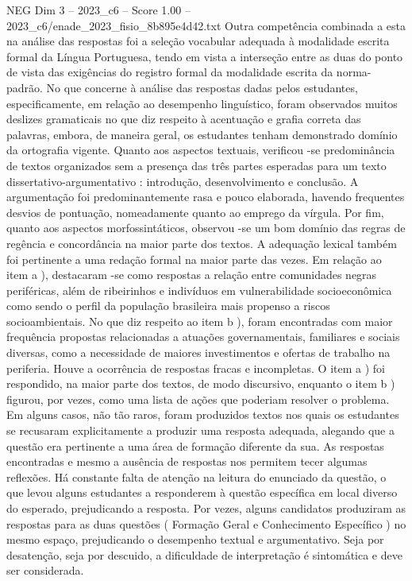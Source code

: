 \begin{textsample}{NEG Dim 3 – 2023\_c6 – Score 1.00 – 2023\_c6/enade\_2023\_fisio\_8b895e4d42.txt}
Outra competência combinada a esta na análise das respostas foi a seleção vocabular adequada à modalidade escrita formal da Língua Portuguesa, tendo em vista a interseção entre as duas do ponto de vista das exigências do registro formal da modalidade escrita da norma-padrão.
No que concerne à análise das respostas dadas pelos estudantes, especificamente, em relação ao desempenho linguístico, foram observados muitos deslizes gramaticais no que diz respeito à acentuação e grafia correta das palavras, embora, de maneira geral, os estudantes tenham demonstrado domínio da ortografia vigente.
Quanto aos aspectos textuais, verificou -se predominância de textos organizados sem a presença das três partes esperadas para um texto dissertativo-argumentativo : introdução, desenvolvimento e conclusão.
A argumentação foi predominantemente rasa e pouco elaborada, havendo frequentes desvios de pontuação, nomeadamente quanto ao emprego da vírgula.
Por fim, quanto aos aspectos morfossintáticos, observou -se um bom domínio das regras de regência e concordância na maior parte dos textos.
A adequação lexical também foi pertinente a uma redação formal na maior parte das vezes.
Em relação ao item a ), destacaram -se como respostas a relação entre comunidades negras periféricas, além de ribeirinhos e indivíduos em vulnerabilidade socioeconômica como sendo o perfil da população brasileira mais propenso a riscos socioambientais.
No que diz respeito ao item b ), foram encontradas com maior frequência propostas relacionadas a atuações governamentais, familiares e sociais diversas, como a necessidade de maiores investimentos e ofertas de trabalho na periferia.
Houve a ocorrência de respostas fracas e incompletas.
O item a ) foi respondido, na maior parte dos textos, de modo discursivo, enquanto o item b ) figurou, por vezes, como uma lista de ações que poderiam resolver o problema.
Em alguns casos, não tão raros, foram produzidos textos nos quais os estudantes se recusaram explicitamente a produzir uma resposta adequada, alegando que a questão era pertinente a uma área de formação diferente da sua.
As respostas encontradas e mesmo a ausência de respostas nos permitem tecer algumas reflexões.
Há constante falta de atenção na leitura do enunciado da questão, o que levou alguns estudantes a responderem à questão específica em local diverso do esperado, prejudicando a resposta.
Por vezes, alguns candidatos produziram as respostas para as duas questões ( Formação Geral e Conhecimento Específico ) no mesmo espaço, prejudicando o desempenho textual e argumentativo.
Seja por desatenção, seja por descuido, a dificuldade de interpretação é sintomática e deve ser considerada.

\end{textsample}
